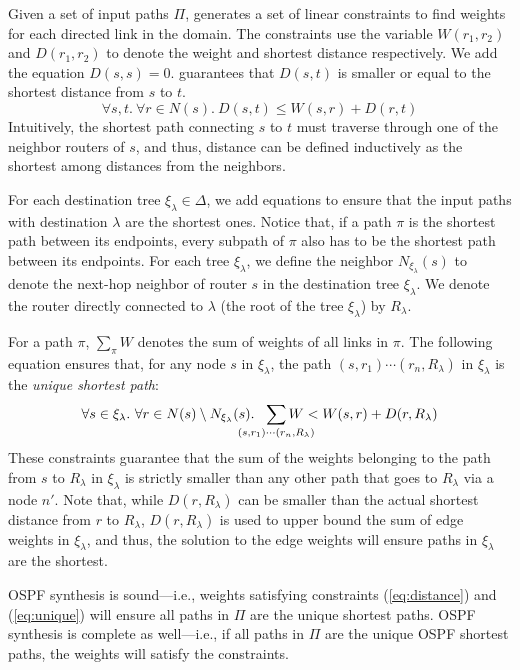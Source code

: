 Given a set of input paths $\Pi$, \name 
generates a set of linear constraints to 
find weights 
for each directed link in the domain.
The constraints use the variable $W(r_1, r_2)$ and
$D(r_1, r_2)$ to denote the weight 
and shortest distance respectively. 
We add the equation $D(s, s) = 0$.  
 guarantees that $D(s,t)$ is smaller or equal to
the shortest distance from $s$ to $t$.
\begin{equation} \label{eq:distance}
\forall s, t. ~\forall r \in N(s).~
D(s,t) \leq W(s,r) + D(r,t)
\end{equation}
Intuitively, the shortest path connecting $s$ to $t$
must traverse through one of the neighbor routers of $s$,
and thus, distance can be defined inductively as the 
shortest among distances from the neighbors. 

For each destination tree $\xi_\lambda\in\Delta$, we add equations to ensure 
that the input paths with destination $\lambda$ are the shortest ones.
Notice that, if a path $\pi$
is the shortest path between its endpoints, every 
subpath of $\pi$ also has to be the shortest path between its endpoints.
For each tree $\xi_\lambda$, we define the neighbor
 $N_{\xi_\lambda}(s)$ to denote the 
next-hop neighbor of router $s$ in the destination tree $\xi_\lambda$. 
We denote the router directly connected 
to $\lambda$ (the root of the tree $\xi_\lambda$) by $R_\lambda$.

For a path $\pi$, 
$\sum_{\pi} W$ denotes the sum of weights of all 
links in $\pi$. 
The following equation ensures that, for any node $s$ in 
$\xi_\lambda$, 
the path $(s,r_1)\cdots (r_n,R_\lambda)$ 
in $\xi_\lambda$ is the 
\emph{unique shortest path}:
\begin{equation} \label{eq:unique}
\forall s \in \xi_\lambda. ~
\forall r \in N(s) \setminus N_{\xi_\lambda}(s).~~
\sum_{\mathclap{\substack{(s,r_1)\cdots (r_n,R_\lambda)}}} 
W < W(s,r) + D(r, R_\lambda)
\end{equation}
These constraints guarantee that 
the sum of the weights belonging to the path 
from $s$ to $R_\lambda$ in $\xi_\lambda$ 
is strictly smaller than 
any other path that goes to $R_\lambda$ via 
a node $n'$. Note that,
while $D(r, R_\lambda)$ can be smaller 
than the actual shortest
distance from $r$ to $R_\lambda$, 
$D(r, R_\lambda)$ is used to upper bound the sum of edge weights 
in $\xi_\lambda$, and  
thus, the solution to the edge weights will ensure 
paths in $\xi_\lambda$ are the shortest. 

OSPF synthesis is sound---i.e., weights satisfying
constraints (\ref{eq:distance}) and (\ref{eq:unique}) 
will ensure all paths in $\Pi$ are the unique shortest paths. 
OSPF synthesis is complete as well---i.e., if all 
paths in $\Pi$ are the unique OSPF shortest paths, 
the weights will satisfy the constraints. 

